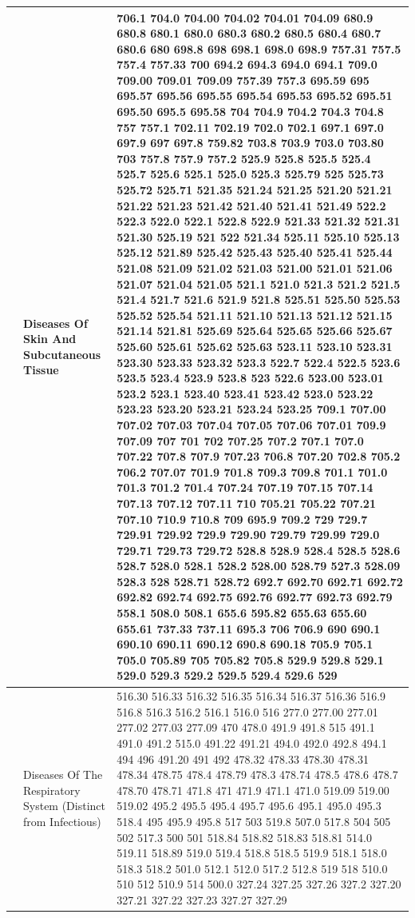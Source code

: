 \documentclass[3p,super,numbers,sort&compress,preprint,10pt]{elsarticle}
\begin{document}
\begin{longtable}{|L{.1in}|L{.6in}||L{5.65in}|}
     & Diseases Of Skin And Subcutaneous Tissue &  706.1 704.0 704.00 704.02 704.01 704.09 680.9 680.8 680.1 680.0 680.3 680.2 680.5 680.4 680.7 680.6 680 698.8 698 698.1 698.0 698.9 757.31 757.5 757.4 757.33 700 694.2 694.3 694.0 694.1 709.0 709.00 709.01 709.09 757.39 757.3 695.59 695 695.57 695.56 695.55 695.54 695.53 695.52 695.51 695.50 695.5 695.58 704 704.9 704.2 704.3 704.8 757 757.1 702.11 702.19 702.0 702.1 697.1 697.0 697.9 697 697.8 759.82 703.8 703.9 703.0 703.80 703 757.8 757.9 757.2 525.9 525.8 525.5 525.4 525.7 525.6 525.1 525.0 525.3 525.79 525 525.73 525.72 525.71 521.35 521.24 521.25 521.20 521.21 521.22 521.23 521.42 521.40 521.41 521.49 522.2 522.3 522.0 522.1 522.8 522.9 521.33 521.32 521.31 521.30 525.19 521 522 521.34 525.11 525.10 525.13 525.12 521.89 525.42 525.43 525.40 525.41 525.44 521.08 521.09 521.02 521.03 521.00 521.01 521.06 521.07 521.04 521.05 521.1 521.0 521.3 521.2 521.5 521.4 521.7 521.6 521.9 521.8 525.51 525.50 525.53 525.52 525.54 521.11 521.10 521.13 521.12 521.15 521.14 521.81 525.69 525.64 525.65 525.66 525.67 525.60 525.61 525.62 525.63 523.11 523.10 523.31 523.30 523.33 523.32 523.3 522.7 522.4 522.5 523.6 523.5 523.4 523.9 523.8 523 522.6 523.00 523.01 523.2 523.1 523.40 523.41 523.42 523.0 523.22 523.23 523.20 523.21 523.24 523.25 709.1 707.00 707.02 707.03 707.04 707.05 707.06 707.01 709.9 707.09 707 701 702 707.25 707.2 707.1 707.0 707.22 707.8 707.9 707.23 706.8 707.20 702.8 705.2 706.2 707.07 701.9 701.8 709.3 709.8 701.1 701.0 701.3 701.2 701.4 707.24 707.19 707.15 707.14 707.13 707.12 707.11 710 705.21 705.22 707.21 707.10 710.9 710.8 709 695.9 709.2 729 729.7 729.91 729.92 729.9 729.90 729.79 729.99 729.0 729.71 729.73 729.72 528.8 528.9 528.4 528.5 528.6 528.7 528.0 528.1 528.2 528.00 528.79 527.3 528.09 528.3 528 528.71 528.72 692.7 692.70 692.71 692.72 692.82 692.74 692.75 692.76 692.77 692.73 692.79 558.1 508.0 508.1 655.6 595.82 655.63 655.60 655.61 737.33 737.11 695.3 706 706.9 690 690.1 690.10 690.11 690.12 690.8 690.18 705.9 705.1 705.0 705.89 705 705.82 705.8 529.9 529.8 529.1 529.0 529.3 529.2 529.5 529.4 529.6 529\\\hline
   & Diseases Of The Respiratory System (Distinct from  Infectious) &  516.30 516.33 516.32 516.35 516.34 516.37 516.36 516.9 516.8 516.3 516.2 516.1 516.0 516 277.0 277.00 277.01 277.02 277.03 277.09 470 478.0 491.9 491.8 515 491.1 491.0 491.2 515.0 491.22 491.21 494.0 492.0 492.8 494.1 494 496 491.20 491 492 478.32 478.33 478.30 478.31 478.34 478.75 478.4 478.79 478.3 478.74 478.5 478.6 478.7 478.70 478.71 471.8 471 471.9 471.1 471.0 519.09 519.00 519.02 495.2 495.5 495.4 495.7 495.6 495.1 495.0 495.3 518.4 495 495.9 495.8 517 503 519.8 507.0 517.8 504 505 502 517.3 500 501 518.84 518.82 518.83 518.81 514.0 519.11 518.89 519.0 519.4 518.8 518.5 519.9 518.1 518.0 518.3 518.2 501.0 512.1 512.0 517.2 512.8 519 518 510.0 510 512 510.9 514 500.0 327.24 327.25 327.26 327.2 327.20 327.21 327.22 327.23 327.27 327.29\\\hline

\end{longtable}
\end{document}
